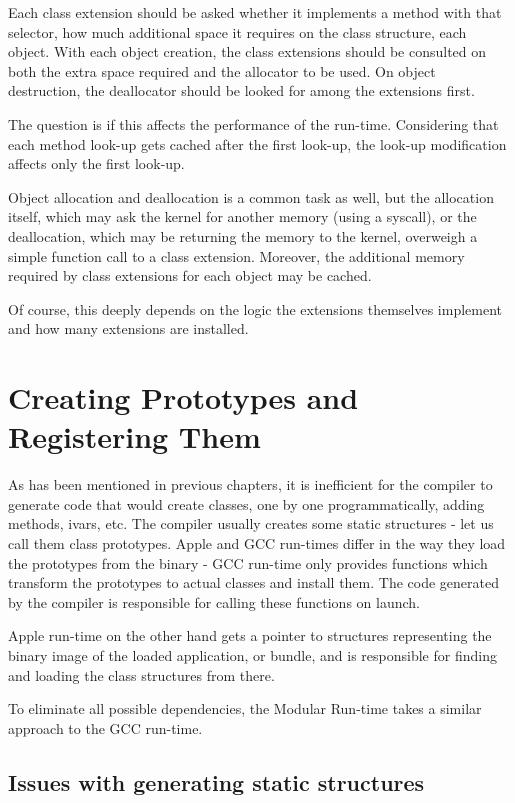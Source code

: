 Each class extension should be asked whether it implements a method with that selector, how much additional space it requires on the class structure, each object. With each object creation, the class extensions should be consulted on both the extra space required and the allocator to be used. On object destruction, the deallocator should be looked for among the extensions first.

The question is if this affects the performance of the run-time. Considering that each method look-up gets cached after the first look-up, the look-up modification affects only the first look-up.

Object allocation and deallocation is a common task as well, but the allocation itself, which may ask the kernel for another memory (using a syscall), or the deallocation, which may be returning the memory to the kernel, overweigh a simple function call to a class extension. Moreover, the additional memory required by class extensions for each object may be cached.

Of course, this deeply depends on the logic the extensions themselves implement and how many extensions are installed.
 
\section{Creating Prototypes and Registering Them}

As has been mentioned in previous chapters, it is inefficient for the compiler to generate code that would create classes, one by one programmatically, adding methods, ivars, etc. The compiler usually creates some static structures - let us call them class prototypes. Apple and GCC run-times differ in the way they load the prototypes from the binary - GCC run-time only provides functions which transform the prototypes to actual classes and install them. The code generated by the compiler is responsible for calling these functions on launch.

Apple run-time on the other hand gets a pointer to structures representing the binary image of the loaded application, or bundle, and is responsible for finding and loading the class structures from there.

To eliminate all possible dependencies, the Modular Run-time takes a similar approach to the GCC run-time.

\subsection{Issues with generating static structures}

